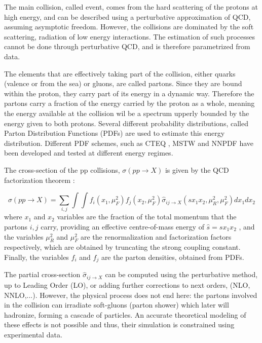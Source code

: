 The main collision, called event, comes from the hard scattering of the protons at high energy, and can be described using a perturbative approximation of QCD, assuming asymptotic freedom. However, the collisions are dominated by the soft scattering, radiation of low energy interactions. The estimation of such processes cannot be done through perturbative QCD, and is therefore parametrized from data.

The elements that are effectively taking part of the collision, either quarks (valence or from the sea) or gluons,  are called partons. Since they are bound within the proton, they carry part of its energy in a dynamic way. Therefore the partons carry a fraction of the energy carried by the proton as a whole, meaning the energy available at the collision wil be a spectrum upperly bounded by the energy given to both protons. Several different probability distributions, called Parton Distribution Functions (PDFs) are used to estimate this energy distribution. Different PDF schemes, such as CTEQ \cite{Pumplin:2002vw}, MSTW \cite{Martin:2009iq} and NNPDF \cite{Ball:2008by} have been developed and tested at different energy regimes.

The cross-section of the pp collisions, $\sigma(pp\rightarrow X)$ is given by the QCD factorization theorem \cite{Butterworth:2012fj}:

\begin{equation}
    \sigma(pp\rightarrow X) = \sum_{i,j} \int \int f_i (x_1 , \mu_F^2 )f_j (x_2 , \mu_F^2 ) \hat{\sigma}_{ij \rightarrow X} (s x_1 x_2 , \mu_R^2 , \mu_F^2 ) dx_1 dx_2 
\end{equation}
where $x_1$ and $x_2$ variables are the fraction of the total momentum that the partons $i,j$ carry, providing an effective centre-of-mass energy of $\hat{s} = sx_1 x_2$ , and the variables $\mu_R^2$ and $\mu_F^2$ are the renormalization and factorization factors respectively, which are obtained by truncating the strong coupling constant. Finally, the variables $f_i$ and $f_j$ are the parton densities, obtained from PDFs.

The partial cross-section $\hat{\sigma}_{ij \rightarrow X}$ can be computed using the perturbative method, up to Leading Order (LO), or adding further corrections to next orders, (NLO, NNLO,...). However, the physical process does not end here: the partons involved in the collision can irradiate soft-gluons (parton shower) which later will hadronize, forming a cascade of particles. An accurate theoretical modeling of these effects is not possible and thus, their simulation is constrained using experimental data.


